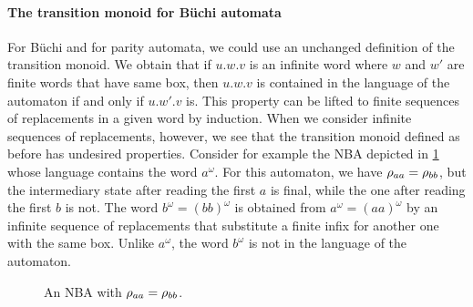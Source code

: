 \documentclass[../../diss.tex]{subfiles}
\begin{document}
\paragraph{The transition monoid for Büchi automata}

For Büchi and for parity automata, we could use an unchanged definition of the transition monoid.
We obtain that if $u.w.v$ is an infinite word where $w$ and $w'$ are finite words that have same box, then $u.w.v$ is contained in the language of the automaton if and only if $u.w'.v$ is.
This property can be lifted to finite sequences of replacements in a given word by induction.
When we consider infinite sequences of replacements, however, we see that the transition monoid defined as before has undesired properties.
Consider for example the NBA depicted in \cref{Figure:AutomatonInfiniteReplacement} whose language contains the word $a^\omega$.
For this automaton, we have $\tbox{aa} = \tbox{bb}$, but the intermediary state after reading the first $a$ is final, while the one after reading the first $b$ is not.
The word $b^\omega = {(bb)}^\omega$ is obtained from $a^\omega = {(aa)}^\omega$ by an infinite sequence of replacements that substitute a finite infix for another one with the same box.
Unlike $a^\omega$, the word $b^\omega$ is not in the language of the automaton.

\begin{figure}[t]
    \centering%
    \caption{An NBA with $\tbox{aa} = \tbox{bb}$.}%
    \label{Figure:AutomatonInfiniteReplacement}%
\end{figure}
\end{document}
